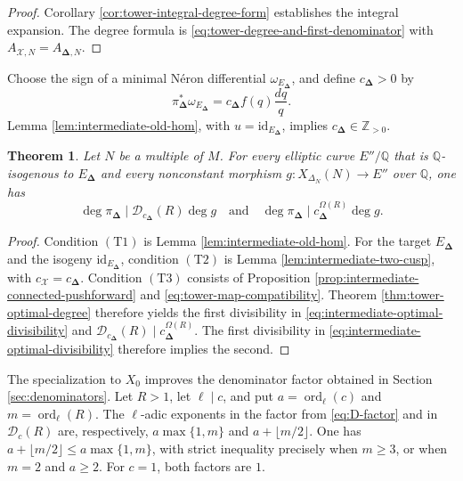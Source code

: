 \documentclass[12pt, letterpaper]{amsart}
\newtheorem{theorem}{Theorem}[section]
\theoremstyle{definition}
\theoremstyle{remark}
\newcommand{\Q}{\mathbb Q}
\newcommand{\Z}{\mathbb Z}
\DeclareMathOperator{\ord}{ord}
\numberwithin{equation}{section}
\begin{document}
\begin{proof}
Corollary \ref{cor:tower-integral-degree-form} establishes the
integral expansion. The degree formula is
\eqref{eq:tower-degree-and-first-denominator} with
\(A_{\mathcal X,N}=A_{\boldsymbol\Delta,N}\).
\end{proof}

Choose the sign of a minimal N\'eron differential
\(\omega_{E_{\boldsymbol\Delta}}\), and define \(c_{\boldsymbol\Delta}>0\) by
\[
        \pi_{\boldsymbol\Delta}^*\omega_{E_{\boldsymbol\Delta}}
        =c_{\boldsymbol\Delta}f(q)\frac{dq}{q}.
\]
Lemma \ref{lem:intermediate-old-hom}, with
\(u=\mathrm{id}_{E_{\boldsymbol\Delta}}\), implies
\(c_{\boldsymbol\Delta}\in\Z_{>0}\).

\begin{theorem}\label{thm:intermediate-optimal}
Let \(N\) be a multiple of \(M\). For every elliptic curve \(E''/\Q\)
that is \(\Q\)-isogenous to \(E_{\boldsymbol\Delta}\) and every nonconstant morphism
\(g:X_{\Delta_N}(N)\to E''\) over \(\Q\), one has
\begin{equation}\label{eq:intermediate-optimal-divisibility}
        \deg\pi_{\boldsymbol\Delta}
        \mid
        \mathcal D_{c_{\boldsymbol\Delta}}(R)\deg g
        \quad\text{and}\quad
        \deg\pi_{\boldsymbol\Delta}
        \mid
        c_{\boldsymbol\Delta}^{\Omega(R)}\deg g.
\end{equation}
\end{theorem}

\begin{proof}
Condition \hyperlink{tower-condition-T1}{\(\mathrm{(T1)}\)} is Lemma \ref{lem:intermediate-old-hom}. For the
target \(E_{\boldsymbol\Delta}\) and the isogeny
\(\mathrm{id}_{E_{\boldsymbol\Delta}}\), condition \hyperlink{tower-condition-T2}{\(\mathrm{(T2)}\)} is Lemma
\ref{lem:intermediate-two-cusp}, with
\(c_{\mathcal X}=c_{\boldsymbol\Delta}\). Condition \hyperlink{tower-condition-T3}{\(\mathrm{(T3)}\)} consists
of Proposition \ref{prop:intermediate-connected-pushforward} and
\eqref{eq:tower-map-compatibility}. Theorem
\ref{thm:tower-optimal-degree} therefore yields the first divisibility in
\eqref{eq:intermediate-optimal-divisibility} and
\(\mathcal D_{c_{\boldsymbol\Delta}}(R)\mid
c_{\boldsymbol\Delta}^{\Omega(R)}\). The first divisibility in
\eqref{eq:intermediate-optimal-divisibility} therefore implies the second.
\end{proof}

The specialization to \(X_0\) improves the denominator factor obtained in
Section \ref{sec:denominators}. Let \(R>1\), let
\(\ell\mid c\), and put \(a=\ord_\ell(c)\) and \(m=\ord_\ell(R)\). The
\(\ell\)-adic exponents in the factor from \eqref{eq:D-factor} and in
\(\mathcal D_c(R)\) are, respectively,
\(a\max\{1,m\}\) and \(a+\lfloor m/2\rfloor\). One has
\(a+\lfloor m/2\rfloor\le a\max\{1,m\}\), with strict inequality precisely
when \(m\ge3\), or when \(m=2\) and \(a\ge2\). For \(c=1\), both factors are
\(1\).
\end{document}
